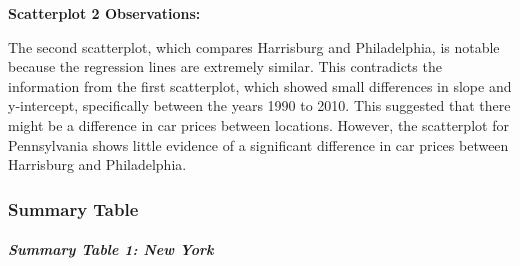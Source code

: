 \documentclass[
]{article}
\begin{document}
\textbf{Scatterplot 2 Observations:}

The second scatterplot, which compares Harrisburg and Philadelphia, is
notable because the regression lines are extremely similar. This
contradicts the information from the first scatterplot, which showed
small differences in slope and y-intercept, specifically between the
years 1990 to 2010. This suggested that there might be a difference in
car prices between locations. However, the scatterplot for Pennsylvania
shows little evidence of a significant difference in car prices between
Harrisburg and Philadelphia.

\hypertarget{summary-table}{%
\subsubsection{\texorpdfstring{\textbf{Summary
Table}}{Summary Table}}\label{summary-table}}

\hypertarget{summary-table-1-new-york}{%
\subparagraph{Summary Table 1: New
York}\label{summary-table-1-new-york}}
\end{document}
